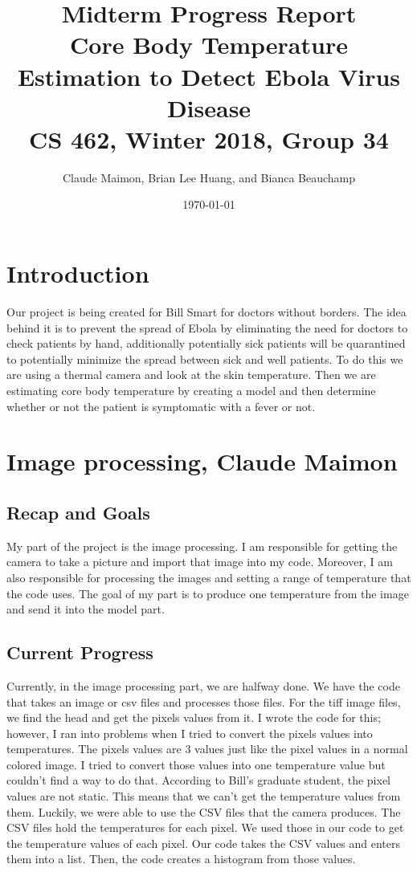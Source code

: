 \documentclass[onecolumn, draftclsnofoot,10pt, compsoc]{IEEEtran}
\title{%
  Midterm Progress Report \\
  \vspace{0.4cm}
  \large Core Body Temperature Estimation to Detect Ebola Virus Disease \\
  \vspace{0.4cm}
  \large CS 462, Winter 2018, Group 34\\
    }
\author{Claude Maimon, Brian Lee Huang, and Bianca Beauchamp}
\date{\today}
\begin{document}
\maketitle

\newpage

\tableofcontents
\newpage

\section{Introduction}

Our project is being created for Bill Smart for doctors without borders. The idea behind it is to prevent the spread of Ebola by eliminating the need for doctors to check patients by hand, additionally potentially sick patients will be quarantined to potentially minimize the spread between sick and well patients.
To do this we are using a thermal camera and look at the skin temperature. Then we are estimating core body temperature by creating a model and then determine whether or not the patient is symptomatic with a fever or not.


\section{Image processing, Claude Maimon}

\subsection{Recap and Goals}
My part of the project is the image processing. I am responsible for getting the camera to take a picture and import that image into my code. Moreover, I am also responsible for processing the images and setting a range of temperature that the code uses. The goal of my part is to produce one temperature from the image and send it into the model part. 


\subsection{Current Progress}
Currently, in the image processing part, we are halfway done. We have the code that takes an image or csv files and processes those files. For the tiff image files, we find the head and get the pixels values from it. I wrote the code for this; however, I ran into problems when I tried to convert the pixels values into temperatures. The pixels values are 3 values just like the pixel values in a normal colored image. I tried to convert those values into one temperature value but couldn’t find a way to do that. According to Bill’s graduate student, the pixel values are not static. This means that we can’t get the temperature values from them. Luckily, we were able to use the CSV files that the camera produces. The CSV files hold the temperatures for each pixel. We used those in our code to get the temperature values of each pixel.  Our code takes the CSV values and enters them into a list. Then, the code creates a histogram from those values. 
\end{document}
